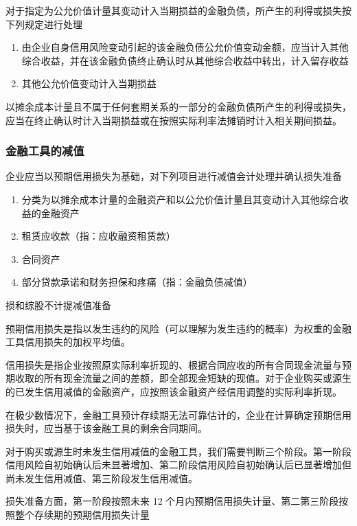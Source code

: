 \documentclass[UTF8,12pt]{ctexart}
\numberwithin{equation}{section} %
\numberwithin{figure}{section}
\numberwithin{table}{section}
\begin{document}
	对于指定为公允价值计量其变动计入当期损益的金融负债，所产生的利得或损失按下列规定进行处理
	\begin{enumerate}
		\item 由企业自身信用风险变动引起的该金融负债公允价值变动金额，应当计入其他综合收益，并在该金融负债终止确认时从其他综合收益中转出，计入留存收益
		
		\item 其他公允价值变动计入当期损益
	\end{enumerate}

	以摊余成本计量且不属于任何套期关系的一部分的金融负债所产生的利得或损失，应当在终止确认时计入当期损益或在按照实际利率法摊销时计入相关期间损益。
	
	
	
	
	\subsubsection{金融工具的减值}
	企业应当以预期信用损失为基础，对下列项目进行减值会计处理并确认损失准备
	\begin{enumerate}
		\item 分类为以摊余成本计量的金融资产和以公允价值计量且其变动计入其他综合收益的金融资产
		
		\item 租赁应收款（指：应收融资租赁款）
		
		\item 合同资产
		
		\item 部分贷款承诺和财务担保和疼痛（指：金融负债减值）
	\end{enumerate}

	损和综股不计提减值准备
	
	预期信用损失是指以发生违约的风险（可以理解为发生违约的概率）为权重的金融工具信用损失的加权平均值。
	
	信用损失是指企业按照原实际利率折现的、根据合同应收的所有合同现金流量与预期收取的所有现金流量之间的差额，即全部现金短缺的现值。对于企业购买或源生的已发生信用减值的金融资产，应按照该金融资产经信用调整的实际利率折现。
	
	在极少数情况下，金融工具预计存续期无法可靠估计的，企业在计算确定预期信用损失时，应当基于该金融工具的剩余合同期间。
	
	对于购买或源生时未发生信用减值的金融工具，我们需要判断三个阶段。第一阶段信用风险自初始确认后未显著增加、第二阶段信用风险自初始确认后已显著增加但尚未发生信用减值、第三阶段发生信用减值。
	
	损失准备方面，第一阶段按照未来 12 个月内预期信用损失计量、第二第三阶段按照整个存续期的预期信用损失计量
	
\end{document}
